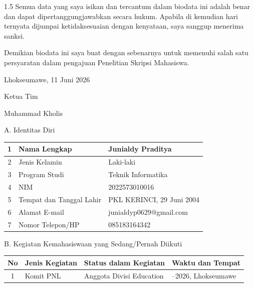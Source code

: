 \documentclass[12pt, a4paper, onecolumn, oneside]{report}
\begin{document}
\begin{spacing}{1.5}
\vspace{0.3cm}
\hspace{1cm} Semua data yang saya isikan dan tercantum dalam biodata ini adalah benar dan dapat dipertanggungjawabkan secara hukum. Apabila di kemudian hari ternyata dijumpai ketidaksesuaian dengan kenyataan, saya sanggup menerima sanksi.

\hspace{1cm} Demikian biodata ini saya buat dengan sebenarnya untuk memenuhi salah satu persyaratan dalam pengajuan Penelitian Skripsi Mahasiswa.

\vspace{2.0cm}
\noindent\hfill Lhokseumawe, 11 Juni 2026

\noindent\hfill Ketua Tim

\vspace{2.0cm}

\noindent\hfill Muhammad Kholis

\newpage

\vspace*{0.2cm}
\noindent A. Identitas Diri

\vspace{0.1cm}
\begin{tabularx}{\textwidth}{|c|>{\raggedright\arraybackslash}p{5.5cm}|X|}
\hline
1 & Nama Lengkap & Junialdy Praditya \\
\hline
2 & Jenis Kelamin & Laki-laki \\
\hline
3 & Program Studi & Teknik Informatika \\
\hline
4 & NIM & 2022573010016 \\
\hline
5 & Tempat dan Tanggal Lahir & PKL KERINCI, 29 Juni 2004 \\
\hline
6 & Alamat E-mail & junialdyp0629@gmail.com \\
\hline
7 & Nomor Telepon/HP & 085183164342 \\
\hline
\end{tabularx}

\vspace{0.2cm}
\noindent B. Kegiatan Kemahasiswaan yang Sedang/Pernah Diikuti

\vspace{0.1cm}
\begin{tabularx}{\textwidth}{|c|X|>{\raggedright\arraybackslash}p{3.8cm}|>{\raggedright\arraybackslash}p{3.8cm}|}
\hline
\rowcolor{lightgray}No & Jenis Kegiatan & Status dalam Kegiatan & Waktu dan Tempat \\
\hline
1 & Komit PNL & Anggota Divisi Education & 2025--2026, Lhokseumawe \\
\hline
\end{tabularx}


\end{spacing}
\end{document}
